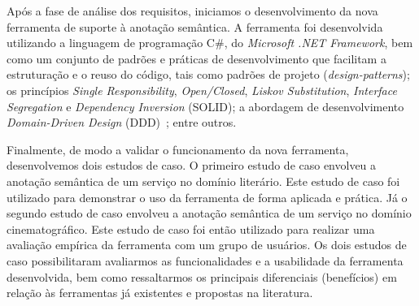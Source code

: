 

Após a fase de análise dos requisitos, iniciamos o desenvolvimento da nova ferramenta de suporte à anotação semântica. A ferramenta foi desenvolvida utilizando a linguagem de programação C\#, do \textit{Microsoft .NET Framework}, bem como um conjunto de padrões e práticas de desenvolvimento que facilitam a estruturação e o reuso do código, tais como padrões de projeto (\textit{design-patterns}); os princípios \textit{Single Responsibility}, \textit{Open/Closed}, \textit{Liskov Substitution}, \textit{Interface Segregation} e \textit{Dependency Inversion} (SOLID); a abordagem de desenvolvimento \textit{Domain-Driven Design} (DDD)~\cite{EVANS-2004-DDD}; entre outros.

Finalmente, de modo a validar o funcionamento da nova ferramenta, desenvolvemos dois estudos de caso. O primeiro estudo de caso envolveu a anotação semântica de um serviço no domínio literário. Este estudo de caso foi utilizado para demonstrar o uso da ferramenta de forma aplicada e prática. Já o segundo estudo de caso envolveu a anotação semântica de um serviço no domínio cinematográfico. Este estudo de caso foi então utilizado para realizar uma avaliação empírica da ferramenta com um grupo de usuários. Os dois estudos de caso possibilitaram avaliarmos as funcionalidades e a usabilidade da ferramenta desenvolvida, bem como ressaltarmos os principais diferenciais (benefícios) em relação às ferramentas já existentes e propostas na literatura.


